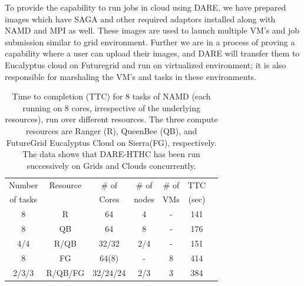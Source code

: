 \documentclass[]{article}
\begin{document}
To provide the capability to run jobs in cloud using DARE, we have
prepared images which have SAGA and other required adaptors installed
along with NAMD and MPI as well.  These images are used to launch
multiple VM's and job submission similar to grid environment. Further
we are in a process of proving a capability where a user can upload
their images, and DARE will transfer them to Eucalyptus cloud on
Futuregrid and run on virtualized environment; it is also responsible
for marshaling the VM's and tasks in these environments.

 \begin{table}
\small
 \begin{tabular}{|c|c|c|c|c|c|c|} 
 \hline 
 Number           & Resource    & \# of &  \# of     &     \# of     &	TTC  \\
of tasks                &     &  Cores    &nodes&   VMs  & (sec) \\  
\hline
8& R&	64	&4 & - &141\\
\hline                  
8& QB	&	64& 8 &	-&176 \\
\hline
4/4&R/QB	&	32/32 &2/4&-&151\\
\hline
8&FG	&	64(8) & - &8&414 \\
\hline
2/3/3&R/QB/FG	&32/24/24&2/3&	3 &384\\
\hline


\end{tabular}
\caption{Time to completion (TTC) for 8 tasks of NAMD (each running on 8 cores,
  irrespective of the underlying resources), run over different resources. The three
  compute resources are Ranger (R), QueenBee (QB), 
  and  FutureGrid  Eucalyptus Cloud on Sierra(FG), respectively. The
  data shows that DARE-HTHC has been run successively on Grids and
  Clouds concurrently.}
 \label{table:HTHP-Distributed} 
\end{table}
\end{document}

